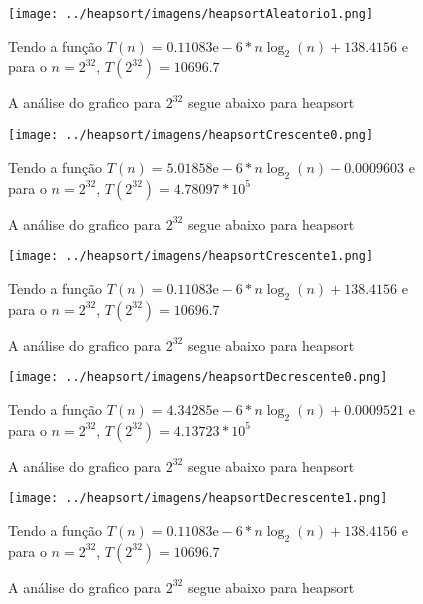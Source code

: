 \documentclass[12pt,a4paper,twoside]{report}
\begin{document}
\begin{figure}[ht]
\centering \texttt{[image: ../heapsort/imagens/heapsortAleatorio1.png]}
\caption{A análise do grafico para $2^{32}$ segue abaixo para heapsort}

Tendo a função $T(n) = 0.11083\mathrm{e}-6*n\log_{2}(n)+138.4156$ e para o $n =2^{32}$, $T(2^{32}) = 10696.7$
\label{fig:heapsortAleatorio1}
\end{figure}




\begin{figure}[ht]
\centering \texttt{[image: ../heapsort/imagens/heapsortCrescente0.png]}
\caption{A análise do grafico para $2^{32}$ segue abaixo para heapsort}

Tendo a função $T(n) = 5.01858\mathrm{e}-6*n\log_{2}(n)-0.0009603$ e para o $n =2^{32}$, $T(2^{32}) = 4.78097*10^5$
\label{fig:heapsortCrescente0}
\end{figure}

\begin{figure}[ht]
\centering \texttt{[image: ../heapsort/imagens/heapsortCrescente1.png]}
\caption{A análise do grafico para $2^{32}$ segue abaixo para heapsort}

Tendo a função $T(n) = 0.11083\mathrm{e}-6*n\log_{2}(n)+138.4156$ e para o $n =2^{32}$, $T(2^{32}) = 10696.7$
\label{fig:heapsortCrescente1}
\end{figure}




\begin{figure}[ht]
\centering \texttt{[image: ../heapsort/imagens/heapsortDecrescente0.png]}
\caption{A análise do grafico para $2^{32}$ segue abaixo para heapsort}

Tendo a função $T(n) = 4.34285\mathrm{e}-6*n\log_{2}(n)+0.0009521$ e para o $n =2^{32}$, $T(2^{32}) = 4.13723*10^{5}$
\label{fig:heapsortDecrescente0}
\end{figure}

\begin{figure}[ht]
\centering \texttt{[image: ../heapsort/imagens/heapsortDecrescente1.png]}
\caption{A análise do grafico para $2^{32}$ segue abaixo para heapsort}

Tendo a função $T(n) = 0.11083\mathrm{e}-6*n\log_{2}(n)+138.4156$ e para o $n =2^{32}$, $T(2^{32}) = 10696.7$
\label{fig:heapsortDecrescente1}
\end{figure}
\end{document}
